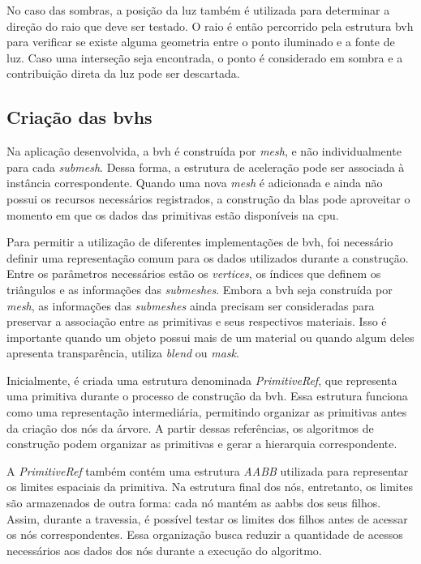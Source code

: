 No caso das sombras, a posição da luz também é utilizada para determinar a direção do raio que deve ser testado. O raio é então percorrido pela estrutura \gls{bvh} para verificar se existe alguma geometria entre o ponto iluminado e a fonte de luz. Caso uma interseção seja encontrada, o ponto é considerado em sombra e a contribuição direta da luz pode ser descartada.

\subsection{Criação das \glspl{bvh}}

Na aplicação desenvolvida, a \gls{bvh} é construída por \textit{mesh}, e não individualmente para cada \textit{submesh}. Dessa forma, a estrutura de aceleração pode ser associada à instância correspondente. Quando uma nova \textit{mesh} é adicionada e ainda não possui os recursos necessários registrados, a construção da \gls{blas} pode aproveitar o momento em que os dados das primitivas estão disponíveis na \gls{cpu}.

Para permitir a utilização de diferentes implementações de \gls{bvh}, foi necessário definir uma representação comum para os dados utilizados durante a construção. Entre os parâmetros necessários estão os \textit{vertices}, os índices que definem os triângulos e as informações das \textit{submeshes}. Embora a \gls{bvh} seja construída por \textit{mesh}, as informações das \textit{submeshes} ainda precisam ser consideradas para preservar a associação entre as primitivas e seus respectivos materiais. Isso é importante quando um objeto possui mais de um material ou quando algum deles apresenta transparência, utiliza \textit{blend} ou \textit{mask}.

Inicialmente, é criada uma estrutura denominada \textit{PrimitiveRef}, que representa uma primitiva durante o processo de construção da \gls{bvh}. Essa estrutura funciona como uma representação intermediária, permitindo organizar as primitivas antes da criação dos nós da árvore. A partir dessas referências, os algoritmos de construção podem organizar as primitivas e gerar a hierarquia correspondente.

A \textit{PrimitiveRef} também contém uma estrutura \textit{AABB} utilizada para representar os limites espaciais da primitiva. Na estrutura final dos nós, entretanto, os limites são armazenados de outra forma: cada nó mantém as \glspl{aabb} dos seus filhos. Assim, durante a travessia, é possível testar os limites dos filhos antes de acessar os nós correspondentes. Essa organização busca reduzir a quantidade de acessos necessários aos dados dos nós durante a execução do algoritmo.

